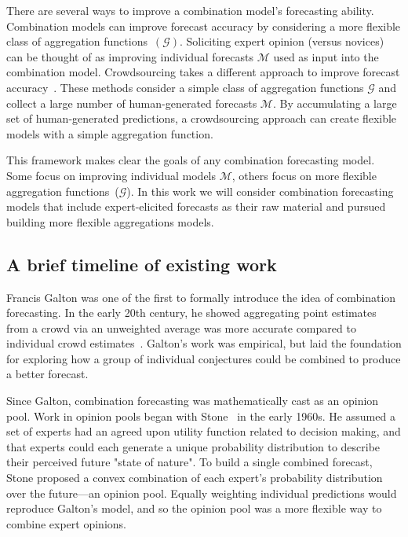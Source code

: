 \documentclass[preprint,authoryear]{elsarticle}
\begin{document}
There are several ways to improve a combination model's forecasting ability.
Combination models can improve forecast accuracy by considering a more flexible class of aggregation functions~$(\mathcal{G})$.
Soliciting expert opinion (versus novices) can be thought of as improving individual forecasts $\mathcal{M}$ used as input into the combination model.
Crowdsourcing takes a different approach to improve forecast accuracy~\citep{howe2006rise,brabham2013crowdsourcing,abernethy2011collaborative,forlines2014crowdsourcing,moran2016epidemic}. 
These methods consider a simple class of aggregation functions $\mathcal{G}$ and collect a large number of human-generated forecasts $\mathcal{M}$.
By accumulating a large set of human-generated predictions, a crowdsourcing approach can create flexible models with a simple aggregation function.

This framework makes clear the goals of any combination forecasting model.
Some focus on improving individual models $\mathcal{M}$, others focus on more flexible aggregation functions~($\mathcal{G}$).
In this work we will consider combination forecasting models that include expert-elicited forecasts as their raw material and pursued building more flexible aggregations models.

\subsection{A brief timeline of existing work}

Francis Galton was one of the first to formally introduce the idea of combination forecasting. 
In the early 20th century, he showed aggregating point estimates from a crowd via an unweighted average was more accurate compared to individual crowd estimates~\citep{galton1907vox}.
Galton's work was empirical, but laid the foundation for exploring how a group of individual conjectures could be combined to produce a better forecast. 

Since Galton, combination forecasting was mathematically cast as an opinion pool.
Work in opinion pools began with Stone~\citep{stone1961opinion} in the early 1960s.
He assumed a set of experts had an agreed upon utility function related to decision making, and that experts could each generate a unique probability distribution to describe their perceived future "state of nature".
To build a single combined forecast, Stone proposed a convex combination of each expert's probability distribution over the future---an opinion pool.
Equally weighting individual predictions would reproduce Galton's model, and so the opinion pool was a more flexible way to combine expert opinions.
\end{document}

